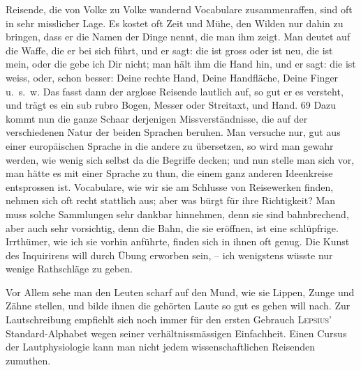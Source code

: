 Reisende, die von Volke zu Volke wandernd Vocabulare zusammenraffen, sind oft in sehr misslicher Lage. Es kostet oft Zeit und Mühe, den Wilden nur dahin zu bringen, dass er die Namen der Dinge nennt, die man ihm zeigt. Man deutet auf die Waffe, die er bei sich führt, und er sagt: die ist gross oder ist neu, die ist mein, oder die gebe ich Dir nicht; man hält ihm die Hand hin, und er sagt: die ist weiss, oder, schon besser: Deine rechte Hand, Deine Handfläche, Deine Finger u.~s.~w. Das fasst dann der arglose Reisende lautlich auf, so gut er es versteht, und trägt es ein sub rubro Bogen, Messer oder Streitaxt, und Hand.  {\textbar}{\textbar}69{\textbar}{\textbar}\label{sp.69}  Dazu kommt nun die ganze Schaar derjenigen Missverständnisse, die auf der verschiedenen Natur der beiden Sprachen beruhen. Man versuche nur, gut aus einer europäischen Sprache in die andere zu übersetzen, so wird man gewahr werden, wie wenig sich selbst da die Begriffe decken; und nun stelle man sich vor, man hätte es mit einer Sprache zu thun, die einem ganz anderen Ideenkreise entsprossen ist. Vocabulare, wie wir sie am Schlusse von Reisewerken finden, nehmen sich oft recht stattlich aus; aber was bürgt für ihre Richtigkeit? Man muss solche Sammlungen sehr dankbar hinnehmen, denn sie sind bahnbrechend, aber \label{fp.70} auch sehr vorsichtig, denn die Bahn, die sie eröffnen, ist eine schlüpfrige. Irrthümer, wie ich sie vorhin anführte, finden sich in ihnen oft genug. Die Kunst des Inquirirens will durch Übung erworben sein, – ich wenigstens wüsste nur wenige Rathschläge zu geben.

Vor Allem sehe man den Leuten scharf auf den Mund, wie sie Lippen, Zunge und Zähne stellen, und bilde ihnen die gehörten Laute so gut es gehen will nach. Zur Lautschreibung empfiehlt sich noch immer für den ersten Gebrauch \textsc{Lepsius}’ Standard-Alphabet wegen seiner verhältnissmässigen Einfachheit. Einen Cursus der Lautphysiologie kann man nicht jedem wissenschaftlichen Reisenden zumuthen.

